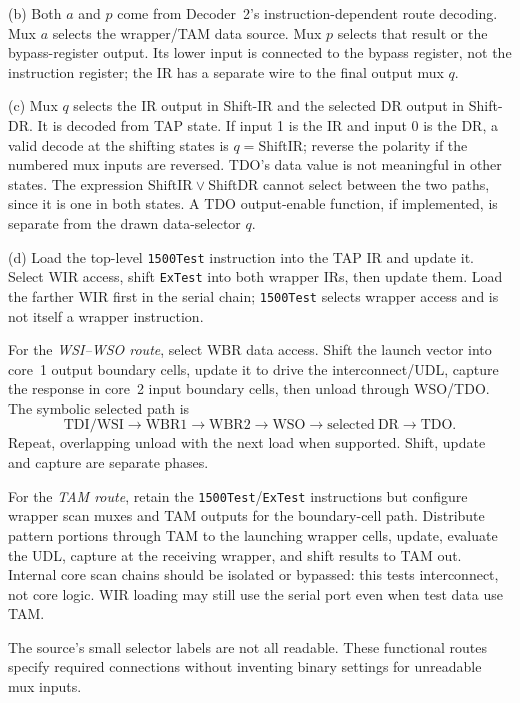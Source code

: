 \documentclass[11pt,a4paper]{article}
\begin{document}
(b) Both $a$ and $p$ come from Decoder~2's instruction-dependent route decoding. Mux $a$ selects the wrapper/TAM data source. Mux $p$ selects that result or the bypass-register output. Its lower input is connected to the bypass register, not the instruction register; the IR has a separate wire to the final output mux $q$.

(c) Mux $q$ selects the IR output in Shift-IR and the selected DR output in Shift-DR. It is decoded from TAP state. If input 1 is the IR and input 0 is the DR, a valid decode at the shifting states is $q=\mathrm{ShiftIR}$; reverse the polarity if the numbered mux inputs are reversed. TDO's data value is not meaningful in other states. The expression $\mathrm{ShiftIR}\lor\mathrm{ShiftDR}$ cannot select between the two paths, since it is one in both states. A TDO output-enable function, if implemented, is separate from the drawn data-selector $q$.

(d) Load the top-level \texttt{1500Test} instruction into the TAP IR and update it. Select WIR access, shift \texttt{ExTest} into both wrapper IRs, then update them. Load the farther WIR first in the serial chain; \texttt{1500Test} selects wrapper access and is not itself a wrapper instruction.

For the \emph{WSI--WSO route}, select WBR data access. Shift the launch vector into core~1 output boundary cells, update it to drive the interconnect/UDL, capture the response in core~2 input boundary cells, then unload through WSO/TDO. The symbolic selected path is
\[
 \mathrm{TDI/WSI}\to\mathrm{WBR1}\to\mathrm{WBR2}\to
 \mathrm{WSO}\to\mathrm{selected\ DR}\to\mathrm{TDO}.
\]
Repeat, overlapping unload with the next load when supported. Shift, update and capture are separate phases.

For the \emph{TAM route}, retain the \texttt{1500Test}/\texttt{ExTest} instructions but configure wrapper scan muxes and TAM outputs for the boundary-cell path. Distribute pattern portions through TAM to the launching wrapper cells, update, evaluate the UDL, capture at the receiving wrapper, and shift results to TAM out. Internal core scan chains should be isolated or bypassed: this tests interconnect, not core logic. WIR loading may still use the serial port even when test data use TAM.

The source's small selector labels are not all readable. These functional routes specify required connections without inventing binary settings for unreadable mux inputs.
\end{document}
